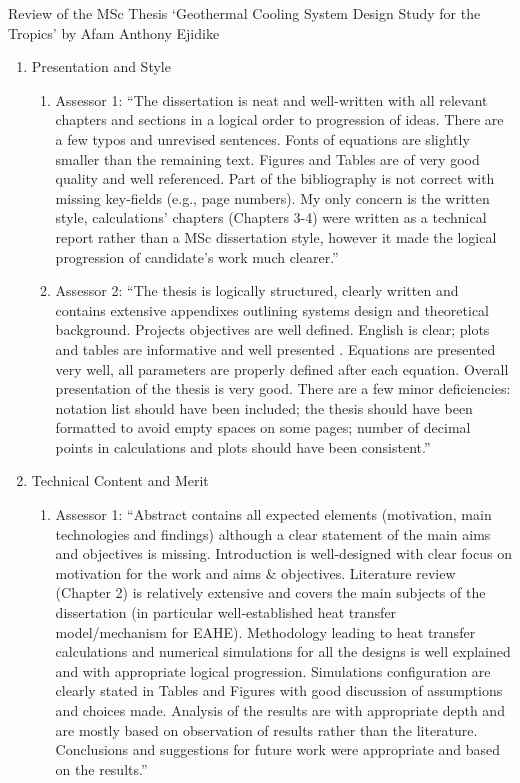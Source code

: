 \documentclass[14pt,twoside]{report}
\begin{document}
\begin{center}
  {\Large Review of the MSc Thesis `Geothermal Cooling System Design Study for the Tropics' by Afam Anthony Ejidike}
\end{center}
\begin{enumerate}%
\item Presentation and Style
    \begin{enumerate}%
       \item Assessor 1: ``The dissertation is neat and well-written with all relevant chapters and sections in a logical order to progression of ideas. There are a few typos and unrevised sentences. Fonts of equations are slightly smaller than the remaining text. Figures and Tables are of very good
quality and well referenced. Part of the bibliography is not correct with missing key-fields (e.g., page numbers). My only concern is the written style, calculations' chapters (Chapters 3-4) were written as a technical report rather than a MSc dissertation style, however it made the logical progression of candidate's work much clearer.''
       \item Assessor 2: ``The thesis is logically structured, clearly written and contains extensive appendixes outlining systems design and theoretical background. Projects objectives are well defined. English is clear; plots and tables are informative and well presented . Equations are presented very well, all parameters are properly defined after each equation. Overall presentation of the thesis is very good. There are a few minor deficiencies: notation list should have been included; the thesis should have been formatted to avoid empty spaces on some pages; number of decimal points in calculations and plots should have been consistent.''
    \end{enumerate}
%  
   \item Technical Content and Merit
    \begin{enumerate}%
       \item Assessor 1: ``Abstract contains all expected elements (motivation, main technologies and findings) although a clear statement of the main aims and objectives is missing. Introduction is well-designed with clear focus on motivation for the work and aims $\&$ objectives. Literature review (Chapter 2) is relatively extensive and covers the main subjects of the dissertation (in particular well-established heat transfer model/mechanism for EAHE). Methodology leading to heat transfer calculations and numerical simulations for all the designs is well explained and with appropriate logical progression. Simulations configuration are clearly stated in Tables and Figures with good discussion of assumptions and choices made. Analysis of the results are with appropriate depth and are mostly based on observation of results rather than the literature. Conclusions and suggestions for future work were appropriate and based on the results.''


\end{enumerate}
\end{enumerate}
\end{document}
